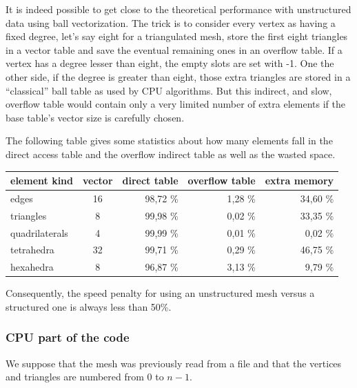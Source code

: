 \documentclass[a4paper,12pt]{article}
\begin{document}
It is indeed possible to get close to the theoretical performance with unstructured data using ball vectorization. The trick is to consider every vertex as having a fixed degree, let's say eight for a triangulated mesh, store the first eight triangles in a vector table and save the eventual remaining ones in an overflow table. If a vertex has a degree lesser than eight, the empty slots are set with -1. One the other side, if the degree is greater than eight, those extra triangles are stored in a ``classical'' ball table as used by CPU algorithms. But this indirect, and slow, overflow table would contain only a very limited number of extra elements if the base table's vector size is carefully chosen.

The following table gives some statistics about how many elements fall in the direct access table and the overflow indirect table as well as the wasted space.

\medskip

\begin{tabular}{|l|c|r|r|r|}
\hline
element kind   & vector & direct table & overflow table & extra memory \\
\hline
edges          &      16 &      98,72 \% &           1,28 \% & 34,60 \% \\
triangles      &       8 &      99,98 \% &           0,02 \% & 33,35 \% \\
quadrilaterals &       4 &      99,99 \% &           0,01 \% &  0,02 \% \\
tetrahedra     &      32 &      99,71 \% &           0,29 \% & 46,75 \% \\
hexahedra      &       8 &      96,87 \% &           3,13 \% &  9,79 \% \\
\hline
\end{tabular}

Consequently, the speed penalty for using an unstructured mesh versus a structured one is always less than 50\%.

\subsubsection{CPU part of the code}
We suppose that the mesh was previously read from a file and that the vertices and triangles are numbered from 0 to $n-1$.
\end{document}
